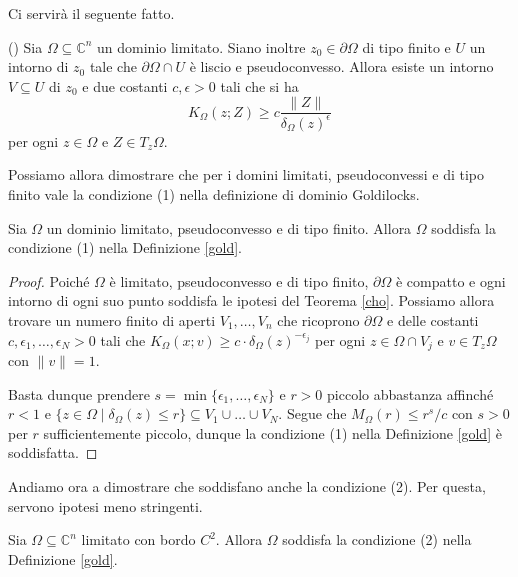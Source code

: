 Ci servirà il seguente fatto.

\begin{thm} \label{cho}
    (\cite[Theorem 1]{C}) Sia $\Omega\subseteq\mathbb{C}^n$ un dominio limitato. Siano inoltre $z_0\in\partial\Omega$ di tipo finito e $U$ un intorno di $z_0$ tale che $\partial\Omega\cap U$ è liscio e pseudoconvesso. Allora esiste un intorno $V\subseteq U$ di $z_0$ e due costanti $c,\epsilon>0$ tali che si ha
    $$K_\Omega(z;Z) \ge c\frac{\|Z\|}{\delta_\Omega(z)^\epsilon}$$
    per ogni $z\in\Omega$ e $Z\in T_z\Omega$.
\end{thm}

Possiamo allora dimostrare che per i domini limitati, pseudoconvessi e di tipo finito vale la condizione (1) nella definizione di dominio Goldilocks.

\begin{cor}
    Sia $\Omega$ un dominio limitato, pseudoconvesso e di tipo finito. Allora $\Omega$ soddisfa la condizione (1) nella Definizione \ref{gold}.
\end{cor}

\begin{proof}
    Poiché $\Omega$ è limitato, pseudoconvesso e di tipo finito, $\partial\Omega$ è compatto e ogni intorno di ogni suo punto soddisfa le ipotesi del Teorema \ref{cho}. Possiamo allora trovare un numero finito di aperti $V_1,\dots, V_n$ che ricoprono $\partial\Omega$ e delle costanti $c,\epsilon_1,\dots,\epsilon_N>0$ tali che $K_\Omega(x;v) \ge c\cdot\delta_\Omega(z)^{-\epsilon_j}$ per ogni $z\in\Omega\cap V_j$ e $v\in T_z\Omega$ con $\|v\|=1$.

    Basta dunque prendere $s=\min\{\epsilon_1,\dots,\epsilon_N\}$ e $r>0$ piccolo abbastanza affinché $r<1$ e $\{z\in\Omega\mid\delta_\Omega(z) \le r\}\subseteq V_1\cup\dots\cup V_N$. Segue che $M_\Omega(r) \le r^s/c$ con $s>0$ per $r$ sufficientemente piccolo, dunque la condizione (1) nella Definizione \ref{gold} è soddisfatta.
\end{proof}

Andiamo ora a dimostrare che soddisfano anche la condizione (2). Per questa, servono ipotesi meno stringenti.

\begin{prop}
    Sia $\Omega\subseteq\mathbb{C}^n$ limitato con bordo $C^2$. Allora $\Omega$ soddisfa la condizione (2) nella Definizione \ref{gold}.
\end{prop}

